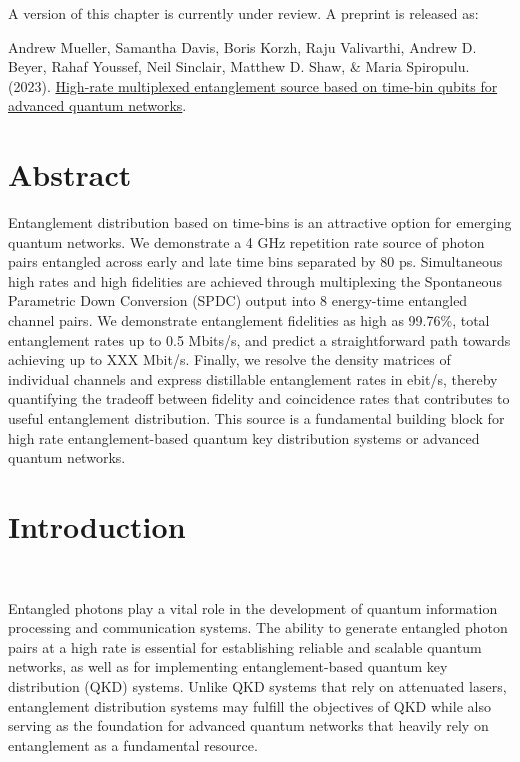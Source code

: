 \documentclass[11pt]{caltech_thesis} %
\begin{document}
A version of this chapter is currently under review. A preprint is
released as:

Andrew Mueller, Samantha Davis, Boris Korzh, Raju Valivarthi, Andrew D.
Beyer, Rahaf Youssef, Neil Sinclair, Matthew D. Shaw, \& Maria
Spiropulu. (2023). \href{https://arxiv.org/abs/2310.01804}{High-rate
multiplexed entanglement source based on time-bin qubits for advanced
quantum networks}.

\hypertarget{abstract-3}{%
\section{Abstract}\label{abstract-3}}

Entanglement distribution based on time-bins is an attractive option for
emerging quantum networks. We demonstrate a 4 GHz repetition rate source
of photon pairs entangled across early and late time bins separated by
80 ps. Simultaneous high rates and high fidelities are achieved through
multiplexing the Spontaneous Parametric Down Conversion (SPDC) output
into 8 energy-time entangled channel pairs. We demonstrate entanglement
fidelities as high as 99.76\%, total entanglement rates up to 0.5
Mbits/s, and predict a straightforward path towards achieving up to
{\color{darkred} XXX} Mbit/s. Finally, we resolve the density matrices
of individual channels and express distillable entanglement rates in
ebit/s, thereby quantifying the tradeoff between fidelity and
coincidence rates that contributes to useful entanglement distribution.
This source is a fundamental building block for high rate
entanglement-based quantum key distribution systems or advanced quantum
networks.

\hypertarget{introduction-3}{%
\section{Introduction}\label{introduction-3}}

~~~~~

Entangled photons play a vital role in the development of quantum
information processing and communication systems. The ability to
generate entangled photon pairs at a high rate is essential for
establishing reliable and scalable quantum networks, as well as for
implementing entanglement-based quantum key distribution (QKD) systems.
Unlike QKD systems that rely on attenuated lasers, entanglement
distribution systems may fulfill the objectives of QKD while also
serving as the foundation for advanced quantum networks that heavily
rely on entanglement as a fundamental resource.
\end{document}
